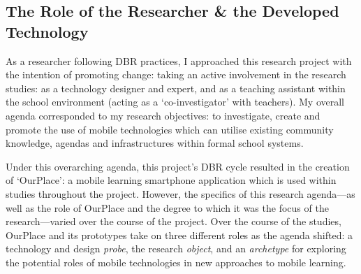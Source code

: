 \subsection{The Role of the Researcher \& the Developed Technology}
\label{sec:RolesOfTechAndResearcher}

As a researcher following DBR practices, I approached this research project with the intention of promoting change: taking an active involvement in the research studies: as a technology designer and expert, and as a teaching assistant within the school environment (acting as a `co-investigator' with teachers). My overall agenda corresponded to my research objectives: to investigate, create and promote the use of mobile technologies which can utilise existing community knowledge, agendas and infrastructures within formal school systems.

Under this overarching agenda, this project's DBR cycle resulted in the creation of `OurPlace': a mobile learning smartphone application which is used within studies throughout the project. However, the specifics of this research agenda---as well as the role of OurPlace and the degree to which it was the focus of the research---varied over the course of the project. Over the course of the studies, OurPlace and its prototypes take on three different roles as the agenda shifted: a technology and design \textit{probe}, the research \textit{object}, and an \textit{archetype} for exploring the potential roles of mobile technologies in new approaches to mobile learning. 

